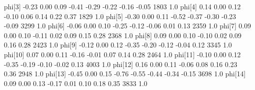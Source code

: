 \documentclass[]{tufte-handout}
\newenvironment{Shaded}{}{}
\newcommand{\DecValTok}[1]{\textcolor[rgb]{0.25,0.63,0.44}{#1}}
\newcommand{\FloatTok}[1]{\textcolor[rgb]{0.25,0.63,0.44}{#1}}
\newcommand{\NormalTok}[1]{#1}
\begin{document}
\begin{Shaded}
\begin{Highlighting}[]
{\NormalTok{phi[}\DecValTok{3}\NormalTok{]    }\FloatTok{-0.23}    \FloatTok{0.00} \FloatTok{0.09}   \FloatTok{-0.41}   \FloatTok{-0.29}   \FloatTok{-0.22}   \FloatTok{-0.16}   \FloatTok{-0.05}  \DecValTok{1803}  \FloatTok{1.0}
\NormalTok{phi[}\DecValTok{4}\NormalTok{]     }\FloatTok{0.14}    \FloatTok{0.00} \FloatTok{0.12}   \FloatTok{-0.10}    \FloatTok{0.06}    \FloatTok{0.14}    \FloatTok{0.22}    \FloatTok{0.37}  \DecValTok{1829}  \FloatTok{1.0}
\NormalTok{phi[}\DecValTok{5}\NormalTok{]    }\FloatTok{-0.30}    \FloatTok{0.00} \FloatTok{0.11}   \FloatTok{-0.52}   \FloatTok{-0.37}   \FloatTok{-0.30}   \FloatTok{-0.23}   \FloatTok{-0.09}  \DecValTok{3299}  \FloatTok{1.0}
\NormalTok{phi[}\DecValTok{6}\NormalTok{]    }\FloatTok{-0.06}    \FloatTok{0.00} \FloatTok{0.10}   \FloatTok{-0.25}   \FloatTok{-0.12}   \FloatTok{-0.06}    \FloatTok{0.01}    \FloatTok{0.13}  \DecValTok{2359}  \FloatTok{1.0}
\NormalTok{phi[}\DecValTok{7}\NormalTok{]     }\FloatTok{0.09}    \FloatTok{0.00} \FloatTok{0.10}   \FloatTok{-0.11}    \FloatTok{0.02}    \FloatTok{0.09}    \FloatTok{0.15}    \FloatTok{0.28}  \DecValTok{2368}  \FloatTok{1.0}
\NormalTok{phi[}\DecValTok{8}\NormalTok{]     }\FloatTok{0.09}    \FloatTok{0.00} \FloatTok{0.10}   \FloatTok{-0.10}    \FloatTok{0.02}    \FloatTok{0.09}    \FloatTok{0.16}    \FloatTok{0.28}  \DecValTok{2423}  \FloatTok{1.0}
\NormalTok{phi[}\DecValTok{9}\NormalTok{]    }\FloatTok{-0.12}    \FloatTok{0.00} \FloatTok{0.12}   \FloatTok{-0.35}   \FloatTok{-0.20}   \FloatTok{-0.12}   \FloatTok{-0.04}    \FloatTok{0.12}  \DecValTok{3345}  \FloatTok{1.0}
\NormalTok{phi[}\DecValTok{10}\NormalTok{]    }\FloatTok{0.07}    \FloatTok{0.00} \FloatTok{0.11}   \FloatTok{-0.16}   \FloatTok{-0.01}    \FloatTok{0.07}    \FloatTok{0.14}    \FloatTok{0.28}  \DecValTok{2464}  \FloatTok{1.0}
\NormalTok{phi[}\DecValTok{11}\NormalTok{]   }\FloatTok{-0.10}    \FloatTok{0.00} \FloatTok{0.12}   \FloatTok{-0.35}   \FloatTok{-0.19}   \FloatTok{-0.10}   \FloatTok{-0.02}    \FloatTok{0.13}  \DecValTok{4003}  \FloatTok{1.0}
\NormalTok{phi[}\DecValTok{12}\NormalTok{]    }\FloatTok{0.16}    \FloatTok{0.00} \FloatTok{0.11}   \FloatTok{-0.06}    \FloatTok{0.08}    \FloatTok{0.16}    \FloatTok{0.23}    \FloatTok{0.36}  \DecValTok{2948}  \FloatTok{1.0}
\NormalTok{phi[}\DecValTok{13}\NormalTok{]   }\FloatTok{-0.45}    \FloatTok{0.00} \FloatTok{0.15}   \FloatTok{-0.76}   \FloatTok{-0.55}   \FloatTok{-0.44}   \FloatTok{-0.34}   \FloatTok{-0.15}  \DecValTok{3698}  \FloatTok{1.0}
\NormalTok{phi[}\DecValTok{14}\NormalTok{]    }\FloatTok{0.09}    \FloatTok{0.00} \FloatTok{0.13}   \FloatTok{-0.17}    \FloatTok{0.01}    \FloatTok{0.10}    \FloatTok{0.18}    \FloatTok{0.35}  \DecValTok{3833}  \FloatTok{1.0}
}
\end{Highlighting}
\end{Shaded}
\end{document}
